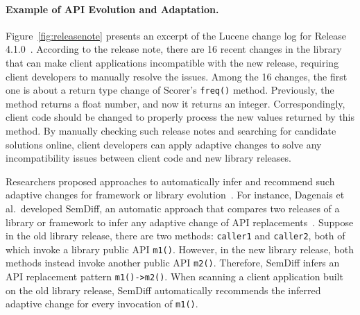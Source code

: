 \documentclass[runningheads,a4paper]{llncs}
\newcommand{\codefont}[1]{\footnotesize{\texttt{#1}}\normalsize}
\begin{document}
\paragraph{Example of API Evolution and Adaptation.} 
Figure~\ref{fig:releasenote} presents an excerpt of the Lucene change log for Release 4.1.0~\cite{releasenote}. According to the release note, there are 16 recent changes in the library that can make client applications incompatible with the new release, requiring client developers to manually resolve the issues. Among the 16 changes, the first one is about a return type change of Scorer's \codefont{freq()} method. Previously, the method returns a float number, and now it returns an integer. Correspondingly, client code should be changed to properly process the new values returned by this method. By manually checking such release notes and searching for candidate solutions online, client developers can apply adaptive changes to solve any incompatibility issues between client code and new library releases.

Researchers proposed approaches to automatically infer and recommend such adaptive changes for framework or library evolution~\cite{Dagenais2008:RAC,Schafer2008:MFU,Zhong2009:MMR,Wu2010:AHA,Nguyen2010:GAA}. For instance, Dagenais et al.~developed SemDiff, an automatic approach that compares two releases of a library or framework to infer any adaptive change of API replacements~\cite{Dagenais2008:RAC}. 
Suppose in the old library release, there are two methods: \codefont{caller1} and \codefont{caller2}, both of which invoke a library public API \codefont{m1()}. However, in the new library release, both methods instead invoke another public API \codefont{m2()}. Therefore, SemDiff infers an API replacement pattern \codefont{m1()->m2()}. When scanning a client application built on the old library release, SemDiff automatically recommends the inferred adaptive change for every invocation of \codefont{m1()}.
\end{document}
